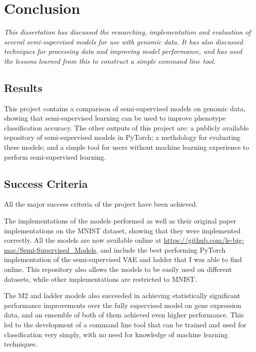 \chapter{Conclusion}

\textit{This dissertation has discussed the researching, implementation and evaluation of several semi-supervised models for use with genomic
data. It has also discussed techniques for processing data and improving model performance, and has used the lessons learned from 
this to construct a simple command line tool.}

\section{Results}

This project contains a comparison of semi-supervised models on genomic data, showing that semi-supervised learning can be used to 
improve phenotype classification accuracy. The other outputs of this project are: a publicly available repository of semi-supervised models in PyTorch; 
a methdology for evaluating these models; and a simple tool for users without machine learning experience to perform semi-supervised 
learning.

\section{Success Criteria}

All the major success criteria of the project have been achieved. 

The implementations of the models performed as well as their original paper implementations on the MNIST dataset, showing that they were 
implemented correctly. All the models are now available online at \url{https://github.com/le-big-mac/Semi-Supervised_Models}, and include the 
best performing PyTorch implementation of the semi-supervised VAE and ladder that I was able to find online. This repository also allows 
the models to be easily used on different datasets, while other implementations are restricted to MNIST. 

The M2 and ladder models also succeeded in achieving statistically significant performance improvements over the fully supervised model on 
gene expression data, and an ensemble of both of them achieved even higher performance. This led to the development of a 
command line tool that can be trained and used for classification very simply, with no need for knowledge of machine learning techniques.

